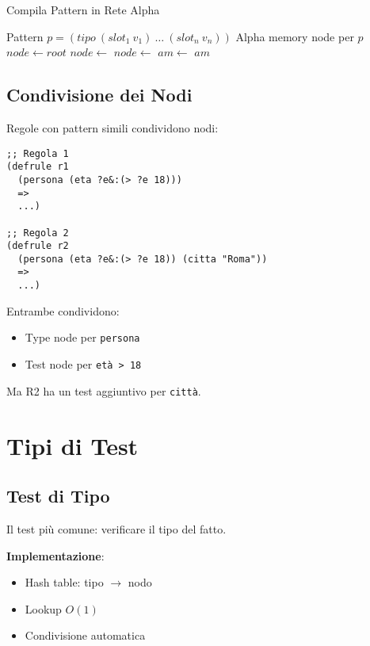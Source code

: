 \begin{algorithm}
\caption{Compila Pattern in Rete Alpha}
\begin{algorithmic}[1]
\Require Pattern $p = (tipo~(slot_1~v_1)~\ldots~(slot_n~v_n))$
\Ensure Alpha memory node per $p$
  \State $node \gets root$
  \State $node \gets $ 
      \State $node \gets $ 
    \EndIf
  \EndFor
  \State $am \gets $ 
  \State \Return $am$
\EndFunction
\end{algorithmic}
\end{algorithm}

\subsection{Condivisione dei Nodi}

Regole con pattern simili condividono nodi:

\begin{lstlisting}[language=CLIPS]
;; Regola 1
(defrule r1
  (persona (eta ?e&:(> ?e 18)))
  =>
  ...)

;; Regola 2  
(defrule r2
  (persona (eta ?e&:(> ?e 18)) (citta "Roma"))
  =>
  ...)
\end{lstlisting}

Entrambe condividono:
\begin{itemize}
\item Type node per \texttt{persona}
\item Test node per \texttt{età > 18}
\end{itemize}

Ma R2 ha un test aggiuntivo per \texttt{città}.

\section{Tipi di Test}

\subsection{Test di Tipo}

Il test più comune: verificare il tipo del fatto.

\textbf{Implementazione}:
\begin{itemize}
\item Hash table: tipo $\rightarrow$ nodo
\item Lookup $O(1)$
\item Condivisione automatica
\end{itemize}

